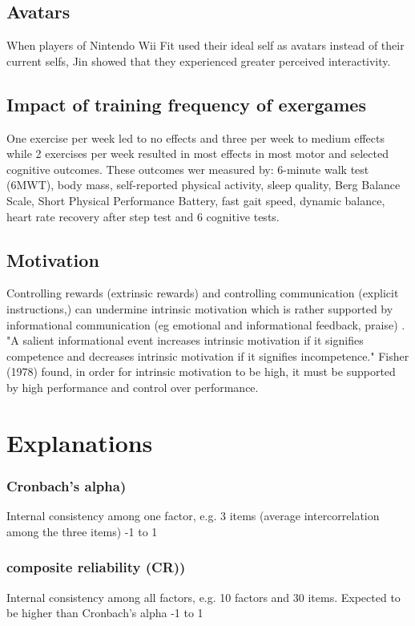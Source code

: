 \section{Avatars}
When players of Nintendo Wii Fit used their ideal self as avatars instead of their current selfs, Jin \cite{jin2009avatars} showed that they experienced greater perceived interactivity.


\section{Impact of training frequency of exergames}
One exercise per week led to no effects and three per week to medium effects while 2 exercises per week resulted in most effects  in most motor and selected cognitive outcomes. These outcomes wer measured by: 6-minute walk test (6MWT), body mass, self-reported physical activity, sleep quality, Berg Balance Scale, Short Physical Performance Battery, fast gait speed, dynamic balance, heart rate recovery after step test and 6 cognitive tests. \cite{hortobagyi2012effects}

\section{Motivation}
Controlling rewards (extrinsic rewards) and controlling communication (explicit instructions,) can undermine intrinsic motivation which is rather supported by informational communication (eg emotional and informational feedback, praise) \cite{ryan1982control}.
"A salient informational event increases intrinsic motivation if it signifies competence and decreases intrinsic motivation if it signifies incompetence."
Fisher (1978) \cite{fisher1978effects} found, in order for intrinsic motivation to be high, it must be supported by high performance and control over performance.



\chapter{Explanations}


\subsection{Cronbach's alpha)}
Internal consistency among one factor, e.g. 3 items (average intercorrelation among the three items)
-1 to 1

\subsection{composite reliability (CR))}
Internal consistency among all factors, e.g. 10 factors and 30 items.
Expected to be higher than Cronbach's alpha
-1 to 1

